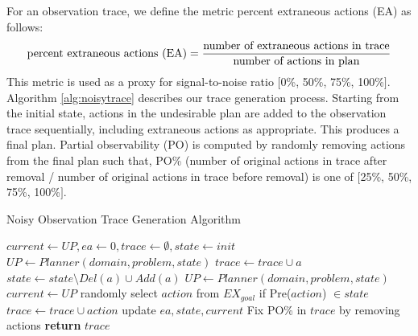 For an observation trace, we define the metric percent extraneous actions (EA) as follows:
\begin{equation}
\textup{percent extraneous actions (EA)} = \frac{\textup{number of extraneous actions in trace}} {\textup{number of actions in plan}}
\end{equation} 
This metric is used as a proxy for signal-to-noise ratio $[$0\%, 50\%, 75\%, 100\%$]$. 
Algorithm \ref{alg:noisytrace} describes our trace generation process. 
Starting from the initial state, actions in the undesirable plan are added to the observation trace sequentially, including extraneous actions as appropriate. 
This produces a final plan. 
Partial observability (PO) is computed by randomly removing actions from the final plan such that, PO\% (number of original actions in trace after removal / number of original actions in trace before removal) is one of $[$25\%, 50\%, 75\%, 100\%$]$. 

\begin{algorithm}
    \caption{Noisy Observation Trace Generation Algorithm}
    \label{alg:noisytrace}
    \begin{algorithmic}[1] %
        	\State $current\gets UP, ea\gets 0, trace\gets \emptyset, state \gets init$
        	\State $UP\gets Planner(domain,problem,state)$
        		\State $trace \gets trace \cup a$
        		\State $state\gets state\setminus Del(a)\cup Add(a)$
        		\EndIf
        		\State $UP\gets Planner(domain,problem,state)$
        		\State $current\gets UP$
        		\State randomly select $action$ from $EX_{goal}$ if Pre($action$) $\in state$
        		\State $trace \gets trace \cup action$
        		\State update $ea, state, current$
        		\EndIf
        	\EndFor
        	\State Fix PO\% in $trace$ by removing actions
            \State \textbf{return} $trace$
        \EndProcedure
    \end{algorithmic}
\end{algorithm}





